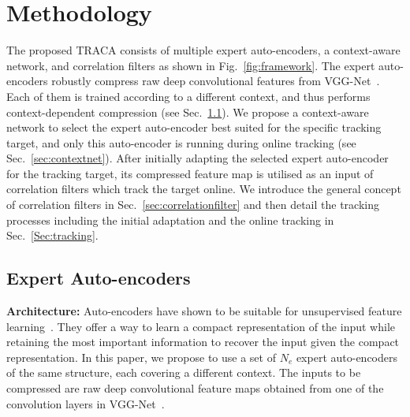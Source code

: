 \documentclass[10pt,twocolumn,letterpaper]{article}
\begin{document}
 \section{Methodology}
The proposed \ac{TRACA} consists of multiple expert auto-encoders, a context-aware network, and correlation filters as shown in Fig.~\ref{fig:framework}. The expert auto-encoders robustly compress raw deep convolutional features from VGG-Net~\cite{ref:vggm}.
Each of them is trained according to a different context, and thus performs context-dependent compression (see Sec.~\ref{sec:expertae}).
We propose a context-aware network to select the expert auto-encoder best suited for the specific tracking target, and only this auto-encoder is running during online tracking (see Sec.~\ref{sec:contextnet}).
After initially adapting the selected expert auto-encoder for the tracking target, its compressed feature map is utilised as an input of correlation filters which track the target online. 
We introduce the general concept of correlation filters in Sec.~\ref{sec:correlationfilter} and then detail the tracking processes including the initial adaptation and the online tracking in Sec.~\ref{Sec:tracking}.











 \subsection{Expert Auto-encoders} \label{sec:expertae}

\textbf{Architecture:}
Auto-encoders have shown to be suitable for unsupervised feature learning~\cite{ref:ae_hinton2006,ref:ae_hinton2006_2,ref:dAE}.
They offer a way to learn a compact representation of the input while retaining the most important information to recover the input given the compact representation.
In this paper, we propose to use a set of $N_e$ expert auto-encoders of the same structure, each covering a different context. 
The inputs to be compressed are raw deep convolutional feature maps obtained from one of the convolution layers in VGG-Net~\cite{ref:vggm}.
\end{document}
